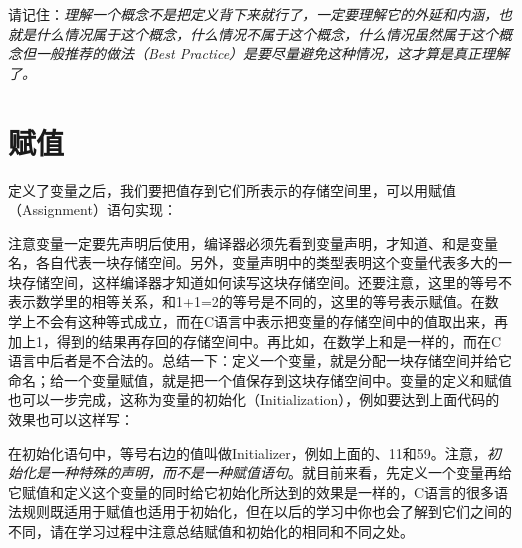 请记住：\emph{理解一个概念不是把定义背下来就行了，一定要理解它的外延和内涵，也就是什么情况属于这个概念，什么情况不属于这个概念，什么情况虽然属于这个概念但一般推荐的做法（Best Practice）是要尽量避免这种情况，这才算是真正理解了。}




\section{赋值}
%
定义了变量之后，我们要把值存到它们所表示的存储空间里，可以用赋值（Assignment）语句实现：




注意变量一定要先声明后使用，编译器必须先看到变量声明，才知道、和是变量名，各自代表一块存储空间。另外，变量声明中的类型表明这个变量代表多大的一块存储空间，这样编译器才知道如何读写这块存储空间。还要注意，这里的等号不表示数学里的相等关系，和1+\BookSplit{}1=\BookSplit{}2的等号是不同的，这里的等号表示赋值。在数学上不会有这种等式成立，而在C语言中表示把变量的存储空间中的值取出来，再加上1，得到的结果再存回的存储空间中。再比如，在数学上和是一样的，而在C语言中后者是不合法的。总结一下：定义一个变量，就是分配一块存储空间并给它命名；给一个变量赋值，就是把一个值保存到这块存储空间中。变量的定义和赋值也可以一步完成，这称为变量的初始化（Initialization），例如要达到上面代码的效果也可以这样写：




在初始化语句中，等号右边的值叫做Initializer，例如上面的、11和59。注意，\emph{初始化是一种特殊的声明，而不是一种赋值语句}。就目前来看，先定义一个变量再给它赋值和定义这个变量的同时给它初始化所达到的效果是一样的，C语言的很多语法规则既适用于赋值也适用于初始化，但在以后的学习中你也会了解到它们之间的不同，请在学习过程中注意总结赋值和初始化的相同和不同之处。



